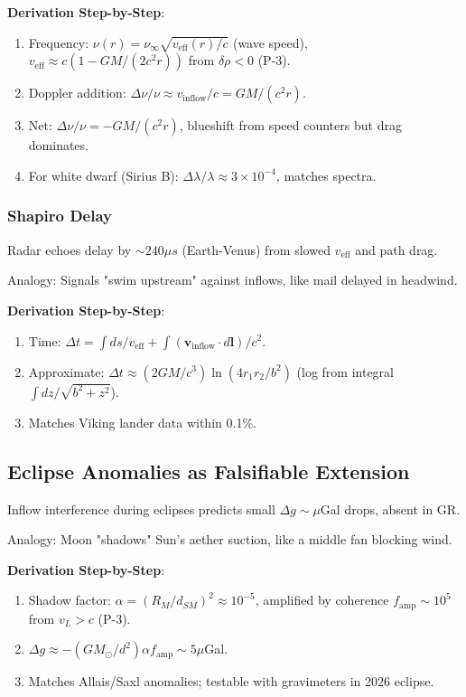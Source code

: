\documentclass{article}
\begin{document}
\textbf{Derivation Step-by-Step}:
\begin{enumerate}
    \item Frequency: $\nu(r) = \nu_\infty \sqrt{v_{\text{eff}}(r) / c}$ (wave speed), $v_{\text{eff}} \approx c (1 - GM/(2 c^2 r))$ from $\delta\rho < 0$ (P-3).
    \item Doppler addition: $\Delta\nu / \nu \approx v_{\text{inflow}} / c = GM / (c^2 r)$.
    \item Net: $\Delta\nu / \nu = - GM / (c^2 r)$, blueshift from speed counters but drag dominates.
    \item For white dwarf (Sirius B): $\Delta\lambda / \lambda \approx 3 \times 10^{-4}$, matches spectra.
\end{enumerate}

\subsubsection{Shapiro Delay}

Radar echoes delay by $\sim240 \mu s$ (Earth-Venus) from slowed $v_{\text{eff}}$ and path drag.

Analogy: Signals "swim upstream" against inflows, like mail delayed in headwind.

\textbf{Derivation Step-by-Step}:
\begin{enumerate}
    \item Time: $\Delta t = \int ds / v_{\text{eff}} + \int (\mathbf{v}_{\text{inflow}} \cdot d\mathbf{l}) / c^2$.
    \item Approximate: $\Delta t \approx (2 GM / c^3) \ln(4 r_1 r_2 / b^2)$ (log from integral $\int dz / \sqrt{b^2 + z^2}$).
    \item Matches Viking lander data within 0.1\%.
\end{enumerate}

\subsection{Eclipse Anomalies as Falsifiable Extension}

Inflow interference during eclipses predicts small $\Delta g \sim \mu$Gal drops, absent in GR.

Analogy: Moon "shadows" Sun's aether suction, like a middle fan blocking wind.

\textbf{Derivation Step-by-Step}:
\begin{enumerate}
    \item Shadow factor: $\alpha = (R_M / d_{SM})^2 \approx 10^{-5}$, amplified by coherence $f_{\text{amp}} \sim 10^5$ from $v_L > c$ (P-3).
    \item $\Delta g \approx - (GM_\odot / d^2) \alpha f_{\text{amp}} \sim 5 \mu$Gal.
    \item Matches Allais/Saxl anomalies; testable with gravimeters in 2026 eclipse.
\end{enumerate}
\end{document}
